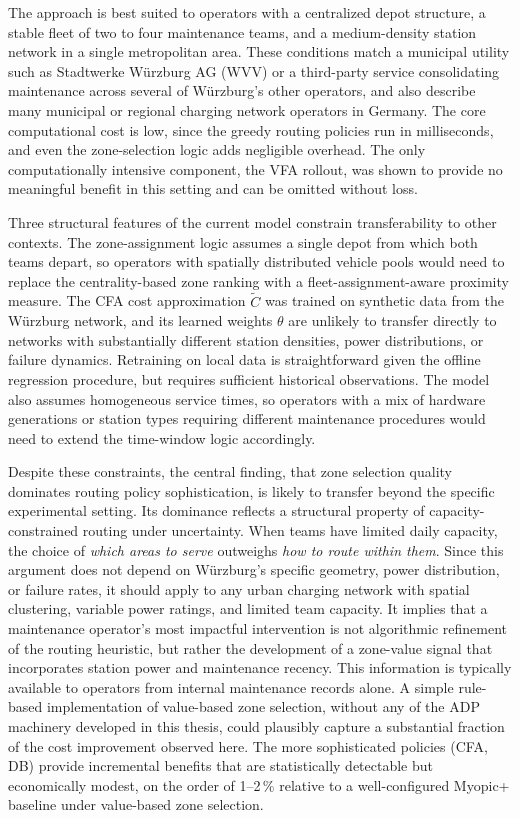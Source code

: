 \documentclass[12pt,oneside]{article}
\begin{document}
The approach is best suited to operators with a centralized depot structure, a stable fleet of two to four maintenance teams, and a medium-density station network in a single metropolitan area. These conditions match a municipal utility such as Stadtwerke Würzburg AG (WVV) or a third-party service consolidating maintenance across several of Würzburg's other operators, and also describe many municipal or regional charging network operators in Germany. The core computational cost is low, since the greedy routing policies run in milliseconds, and even the zone-selection logic adds negligible overhead. The only computationally intensive component, the VFA rollout, was shown to provide no meaningful benefit in this setting and can be omitted without loss.

Three structural features of the current model constrain transferability to other contexts. The zone-assignment logic assumes a single depot from which both teams depart, so operators with spatially distributed vehicle pools would need to replace the centrality-based zone ranking with a fleet-assignment-aware proximity measure. The CFA cost approximation $\tilde{C}$ was trained on synthetic data from the Würzburg network, and its learned weights $\theta$ are unlikely to transfer directly to networks with substantially different station densities, power distributions, or failure dynamics. Retraining on local data is straightforward given the offline regression procedure, but requires sufficient historical observations. The model also assumes homogeneous service times, so operators with a mix of hardware generations or station types requiring different maintenance procedures would need to extend the time-window logic accordingly.

Despite these constraints, the central finding, that zone selection quality dominates routing policy sophistication, is likely to transfer beyond the specific experimental setting. Its dominance reflects a structural property of capacity-constrained routing under uncertainty. When teams have limited daily capacity, the choice of \emph{which areas to serve} outweighs \emph{how to route within them}. Since this argument does not depend on Würzburg's specific geometry, power distribution, or failure rates, it should apply to any urban charging network with spatial clustering, variable power ratings, and limited team capacity. It implies that a maintenance operator's most impactful intervention is not algorithmic refinement of the routing heuristic, but rather the development of a zone-value signal that incorporates station power and maintenance recency. This information is typically available to operators from internal maintenance records alone. A simple rule-based implementation of value-based zone selection, without any of the ADP machinery developed in this thesis, could plausibly capture a substantial fraction of the cost improvement observed here. The more sophisticated policies (CFA, DB) provide incremental benefits that are statistically detectable but economically modest, on the order of 1--2\,\% relative to a well-configured Myopic+ baseline under value-based zone selection.
\end{document}
